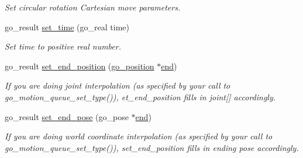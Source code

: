 \begin{DoxyCompactItemize}
\begin{DoxyCompactList}\small\item\em Set circular rotation Cartesian move parameters. \end{DoxyCompactList}\item 
go\-\_\-result \hyperlink{structgomotion_1_1go__motion__spec_aad2d4b504cd2b02b1202bac4c134b7e9}{set\-\_\-time} (go\-\_\-real time)
\begin{DoxyCompactList}\small\item\em Set time to positive real number. \end{DoxyCompactList}\item 
go\-\_\-result \hyperlink{structgomotion_1_1go__motion__spec_ab71360b76432e6f584d09dc8c014971b}{set\-\_\-end\-\_\-position} (\hyperlink{structgomotion_1_1go__position}{go\-\_\-position} $\ast$\hyperlink{structgomotion_1_1go__motion__spec_a8e19d2d27bfa3a3c633bae73641f4e45}{end})
\begin{DoxyCompactList}\small\item\em If you are doing joint interpolation (as specified by your call to go\-\_\-motion\-\_\-queue\-\_\-set\-\_\-type()), et\-\_\-end\-\_\-position fills in joint\mbox{[}\mbox{]} accordingly. \end{DoxyCompactList}\item 
go\-\_\-result \hyperlink{structgomotion_1_1go__motion__spec_a611ec60ffee7577165ece8272cddd67a}{set\-\_\-end\-\_\-pose} (go\-\_\-pose $\ast$\hyperlink{structgomotion_1_1go__motion__spec_a8e19d2d27bfa3a3c633bae73641f4e45}{end})
\begin{DoxyCompactList}\small\item\em If you are doing world coordinate interpolation (as specified by your call to go\-\_\-motion\-\_\-queue\-\_\-set\-\_\-type()), set\-\_\-end\-\_\-position fills in ending pose accordingly. \end{DoxyCompactList}\end{DoxyCompactItemize}
